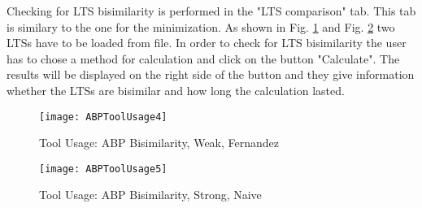 Checking for LTS bisimilarity is performed in the "LTS comparison" tab. This tab is 
similary to the one for the minimization. As shown in Fig. \ref{fig:abptoolusage4} and
Fig. \ref{fig:abptoolusage5} two LTSs have to be loaded from file. In order to check for LTS 
bisimilarity the user has to chose a method for calculation and click on the button 
"Calculate". The results will be displayed on the right side of the button and they
give information whether the LTSs are bisimilar and how long the calculation lasted.

\begin{figure}[h]
\centering
\texttt{[image: ABPToolUsage4]}
\caption{Tool Usage: ABP Bisimilarity, Weak, Fernandez}
\label{fig:abptoolusage4}
\end{figure}

\begin{figure}[h]
\centering
\texttt{[image: ABPToolUsage5]}
\caption{Tool Usage: ABP Bisimilarity, Strong, Naive}
\label{fig:abptoolusage5}
\end{figure}